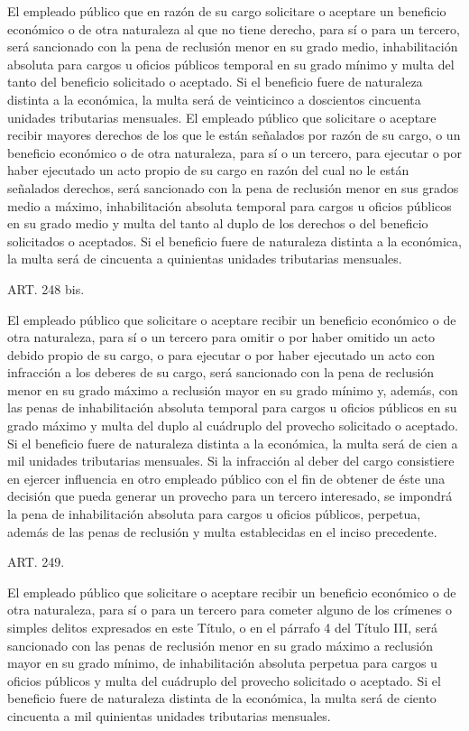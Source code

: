     El empleado público que en razón de su cargo solicitare o aceptare un beneficio económico o de otra naturaleza al que no tiene derecho, para sí o para un tercero, será sancionado con la pena de reclusión menor en su grado medio, inhabilitación absoluta para cargos u oficios públicos temporal en su grado mínimo y multa del tanto del beneficio solicitado o aceptado. Si el beneficio fuere de naturaleza distinta a la económica, la multa será de veinticinco a doscientos cincuenta unidades tributarias mensuales.
    El empleado público que solicitare o aceptare recibir mayores derechos de los que le están señalados por razón de su cargo, o un beneficio económico o de otra naturaleza, para sí o un tercero, para ejecutar o por haber ejecutado un acto propio de su cargo en razón del cual no le están señalados derechos, será sancionado con la pena de reclusión menor en sus grados medio a máximo, inhabilitación absoluta temporal para cargos u oficios públicos en su grado medio y multa del tanto al duplo de los derechos o del beneficio solicitados o aceptados. Si el beneficio fuere de naturaleza distinta a la económica, la multa será de cincuenta a quinientas unidades tributarias mensuales.





    ART. 248 bis.

    El empleado público que solicitare o aceptare recibir un beneficio económico o de otra naturaleza, para sí o un tercero para omitir o por haber omitido un acto debido propio de su cargo, o para ejecutar o por haber ejecutado un acto con infracción a los deberes de su cargo, será sancionado con la pena de reclusión menor en su grado máximo a reclusión mayor en su grado mínimo y, además, con las penas de inhabilitación absoluta temporal para cargos u oficios públicos en su grado máximo y multa del duplo al cuádruplo del provecho solicitado o aceptado. Si el beneficio fuere de naturaleza distinta a la económica, la multa será de cien a mil unidades tributarias mensuales.
    Si la infracción al deber del cargo consistiere en ejercer influencia en otro empleado público con el fin de obtener de éste una decisión que pueda generar un provecho para un tercero interesado, se impondrá la pena de inhabilitación absoluta para cargos u oficios públicos, perpetua, además de las penas de reclusión y multa establecidas en el inciso precedente.




    ART. 249.

    El empleado público que solicitare o aceptare recibir un beneficio económico o de otra naturaleza, para sí o para un tercero para cometer alguno de los crímenes o simples delitos expresados en este Título, o en el párrafo 4 del Título III, será sancionado con las penas de reclusión menor en su grado máximo a reclusión mayor en su grado mínimo, de inhabilitación absoluta perpetua para cargos u oficios públicos y multa del cuádruplo del provecho solicitado o aceptado. Si el beneficio fuere de naturaleza distinta de la económica, la multa será de ciento cincuenta a mil quinientas unidades tributarias mensuales.

